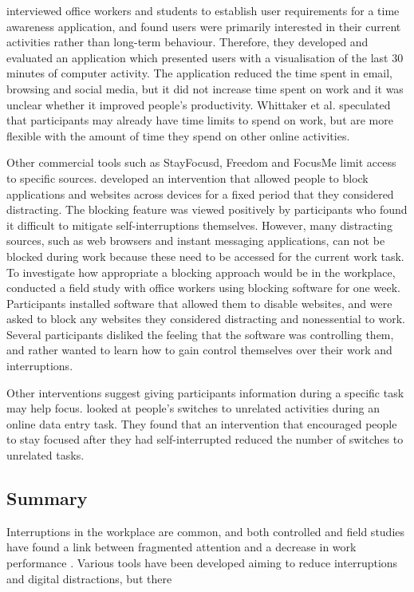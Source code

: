 \citet{Whittaker2016} interviewed office workers and students to establish user requirements for a time awareness application, and found users were primarily interested in their current activities rather than long-term behaviour. Therefore, they developed and evaluated an application which presented users with a visualisation of the last 30 minutes of computer activity. The application reduced the time spent in email, browsing and social media, but it did not increase time spent on work and it was unclear whether it improved people’s productivity. Whittaker et al. speculated that participants may already have time limits to spend on work, but are more flexible with the amount of time they spend on other online activities.

Other commercial tools such as StayFocusd, Freedom and FocusMe limit access to specific sources. \citet{Kim2017} developed an intervention that allowed people to block applications and websites across devices for a fixed period that they considered distracting. The blocking feature was viewed positively by participants who found it difficult to mitigate self-interruptions themselves. However, many distracting sources, such as web browsers and instant messaging applications, can not be blocked during work because these need to be accessed for the current work task. To investigate how appropriate a blocking approach would be in the workplace, \citet{Mark2018} conducted a field study with office workers using blocking software for one week. Participants installed software that allowed them to disable websites, and were asked to block any websites they considered distracting and nonessential to work. Several participants disliked the feeling that the software was controlling them, and rather wanted to learn how to gain control themselves over their work and interruptions.

Other interventions suggest giving participants information during a specific task may help focus. \citet{Gould2016a} looked at people’s switches to unrelated activities during an online data entry task. They found that an intervention that encouraged people to stay focused after they had self-interrupted reduced the number of switches to unrelated tasks. 

\subsection{Summary}
Interruptions in the workplace are common, and both controlled and field studies have found a link between fragmented attention and a decrease in work performance \citep{Bailey2001, Carrier2015}. Various tools have been developed aiming to reduce interruptions and digital distractions, but there 


